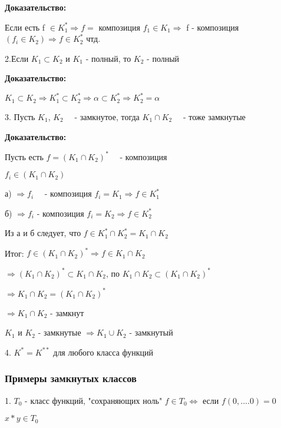 \documentclass[russian]{lecture-notes}
\begin{document}
    \textbf{Доказательство:}

    Если есть f $\in K_{1}^{*} \Rightarrow f = $ композиция $f_{1} \in K_{1} \Rightarrow$
    f - композиция $(f_{i} \in K_{2}) \Rightarrow f \in K_{2}^{*} $ чтд.

    2.Если $K_{1} \subset K_{2}$ и $K_{1}$ - полный, то $K_{2}$ - полный

    \textbf{Доказательство:}

    $K_{1} \subset K_{2} \Rightarrow K_{1}^{*} \subset K_{2}^{*} \Rightarrow \alpha
    \subset K_{2}^{*} \Rightarrow K_{2}^{*} = \alpha
    $

    3. Пусть $K_{1}$, $K_{2}$ ~~- замкнутое, тогда $K_{1} \cap K_{2}$ ~~- тоже замкнутые

    \textbf{Доказательство:}

    Пусть есть $f = (K_{1} \cap K_{2})^{*} $ ~~- композиция

    $f_i \in (K_{1} \cap K_{2})$

    а) $\Rightarrow f_i $ ~~- композиция $ f_i = K_1 \Rightarrow f \in K_{1}^{*}$

    б) $\Rightarrow f_i $ - композиция $f_i = K_2 \Rightarrow f \in K_{2}^{*}$

    Из а и б следует, что $ f \in K_{1}^{*} \cap K_{2}^{*} = K_{1} \cap K_{2}$

    Итог: $f \in (K_{1} \cap K_{2})^{*} \Rightarrow f \in K_{1} \cap K_{2}$

    $\Rightarrow    (K_{1} \cap K_{2})^{*} \subset K_{1} \cap K_{2}$,
    по $K_{1} \cap K_{2} \subset (K_{1}
    \cap K_{2})^{*}$

    $\Rightarrow K_{1} \cap K_{2} = (K_{1} \cap K_{2})^{*}$

    $\Rightarrow K_{1} \cap K_{2} $ - замкнут

    \begin{remark}
        $K_{1}$ и $K_{2}$ - замкнутые $\Rightarrow K_{1} \cup K_{2} $ - замкнутый
    \end{remark}

    4. $K^{*} = K^{**}$ для любого класса функций

    \subsubsection{Примеры замкнутых классов}

    1. $T_{0}$ - класс функций, "сохраняющих ноль" $f \in T_{0} \Leftrightarrow$  если
    $f(0,....0) = 0$

    $x*y \in T_{0}$
\end{document}
